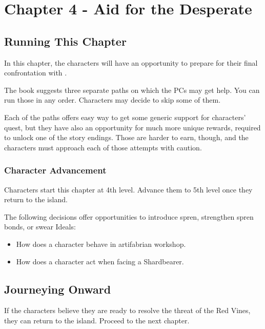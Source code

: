 \chapter{Chapter 4 - Aid for the Desperate} 

\setcounter{section}{-1}
\section{Running This Chapter}

In this chapter, the characters will have an opportunity to prepare for their final confrontation with \npcSprenVines{}. 

The book suggests three separate paths on which the PCs may get help. You can run those in any order. Characters may decide to skip some of them.

Each of the paths offers easy way to get some generic support for characters' quest, but they have also an opportunity for much more unique rewards, required to unlock one of the story endings. Those are harder to earn, though, and the characters must approach each of those attempts with caution.



\subsection{Character Advancement}

Characters start this chapter at 4th level. Advance them to 5th level once they return to the island.

The following decisions offer opportunities to introduce spren, strengthen spren bonds, or swear Ideals:

\begin{itemize}
	\item How does a character behave in artifabrian workshop.
	\item How does a character act when facing a Shardbearer.
\end{itemize}



\newpage



\section{Journeying Onward}

If the characters believe they are ready to resolve the threat of the Red Vines, they can return to the island. Proceed to the next chapter.



